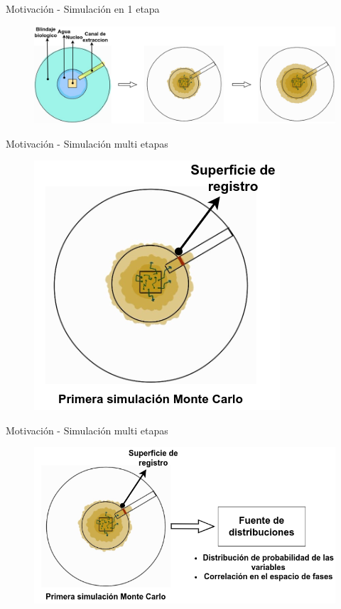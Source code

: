 \documentclass[aspectratio=169,english]{beamer}
\begin{document}
\begin{frame}{Motivación - Simulación en 1 etapa}
    \begin{figure}
        \centering
        \includegraphics[width=1\linewidth]{imagens/nucleo3.png}
    \end{figure}
\end{frame}

\begin{frame}{Motivación - Simulación multi etapas}
    \begin{figure}
        \centering
        \includegraphics[width=0.45\linewidth]{imagens/nucleo6.png}
    \end{figure}
\end{frame}

\begin{frame}{Motivación - Simulación multi etapas}
    \begin{figure}
        \centering
        \includegraphics[width=0.8\linewidth]{imagens/nucleo5.png}
    \end{figure}
\end{frame}
\end{document}
